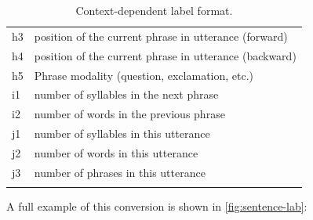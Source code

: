 \begin{longtable}[!htpb]{p{} p{}}
h3 & position of the current phrase in utterance (forward) \\
h4 & position of the current phrase in utterance (backward) \\
h5 & Phrase modality (question, exclamation, etc.)\\
\midrule
i1 & number of syllables in the next phrase \\
i2 & number of words in the previous phrase \\
\midrule
j1 & number of syllables in this utterance \\
j2 & number of words in this utterance \\
j3 & number of phrases in this utterance \\
\bottomrule
\caption{\label{table:lab_format}Context-dependent label format.}\\
\end{longtable}


A full example of this conversion is shown in \ref{fig:sentence-lab}:

